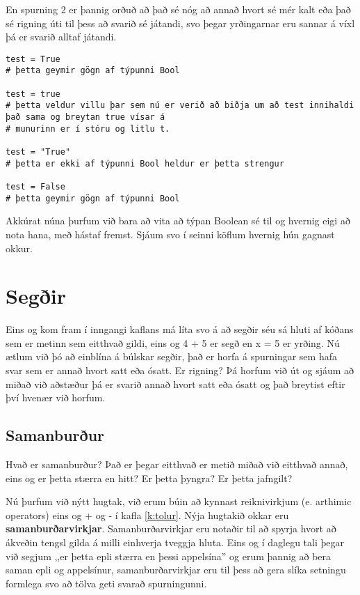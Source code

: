 En spurning 2 er þannig orðuð að það sé nóg að annað hvort sé mér kalt eða það sé rigning úti til þess að svarið sé játandi, svo þegar yrðingarnar eru sannar á víxl þá er svarið alltaf játandi.
\begin{lstlisting}[caption=Boolean gildi, label=lst:bool-breytur]
test = True
# þetta geymir gögn af týpunni Bool

test = true
# þetta veldur villu þar sem nú er verið að biðja um að test innihaldi það sama og breytan true vísar á
# munurinn er í stóru og litlu t.

test = "True"
# þetta er ekki af týpunni Bool heldur er þetta strengur

test = False
# þetta geymir gögn af týpunni Bool
\end{lstlisting}

Akkúrat núna þurfum við bara að vita að týpan Boolean sé til og hvernig eigi að nota hana, með hástaf fremst.
Sjáum svo í seinni köflum hvernig hún gagnast okkur.


\section{Segðir}

Eins og kom fram í inngangi kaflans má líta svo á að segðir séu sá hluti af kóðans sem er metinn sem eitthvað gildi, eins og 4 + 5 er segð en x = 5 er yrðing.
Nú ætlum við þó að einblína á búlskar segðir, það er horfa á spurningar sem hafa svar sem er annað hvort satt eða ósatt.
Er rigning?
Þá horfum við út og sjáum að miðað við aðstæður þá er svarið annað hvort satt eða ósatt og það breytist eftir því hvenær við horfum.

\subsection{Samanburður}
Hvað er samanburður?
Það er þegar eitthvað er metið miðað við eitthvað annað, eins og er þetta stærra en hitt?
Er þetta þyngra?
Er þetta jafngilt?

Nú þurfum við nýtt hugtak, við erum búin að kynnast reiknivirkjum (e. arthimic operators) eins og + og - í kafla \ref{k:tolur}.
Nýja hugtakið okkar eru \textbf{samanburðarvirkjar}.
Samanburðarvirkjar eru notaðir til að spyrja hvort að ákveðin tengsl gilda á milli einhverja tveggja hluta.
Eins og í daglegu tali þegar við segjum ,,er þetta epli stærra en þessi appelsína'' og erum þannig að bera saman epli og appelsínur, samanburðarvirkjar eru til þess að gera slíka setningu formlega svo að tölva geti svarað spurningunni.


